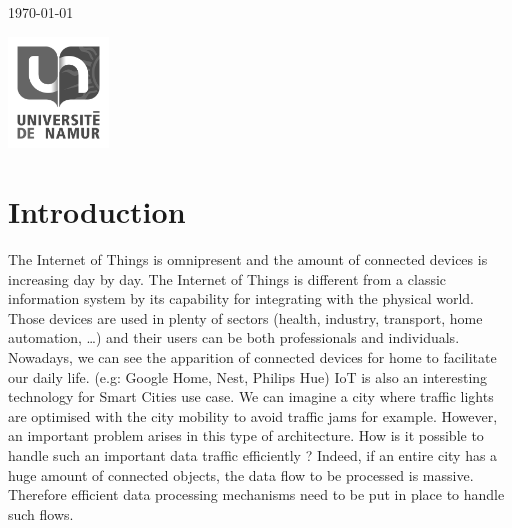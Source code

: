 \documentclass[11pt]{article}
\begin{document}
\begin{titlepage}
	
	\vfill\vfill\vfill %
	
	{\large\today} %
	
	
	\vfill\vfill
	\includegraphics[width=0.2\textwidth]{placeholder.png}\\[1cm] %
	 
	
	\vfill %
	
\end{titlepage}



\section{Introduction}

The Internet of Things is omnipresent and the amount of connected devices is increasing day by day.
The Internet of Things is different from a classic information system by its capability for integrating with the physical world.
Those devices are used in plenty of sectors (health, industry, transport, home automation, \ldots) and their users can be both professionals and individuals.
Nowadays, we can see the apparition of connected devices for home to facilitate our daily life. (e.g: Google Home, Nest, Philips Hue)
IoT is also an interesting technology for Smart Cities use case.
We can imagine a city where traffic lights are optimised with the city mobility to avoid traffic jams for example.
However, an important problem arises in this type of architecture.
How is it possible to handle such an important data traffic efficiently ?
Indeed, if an entire city has a huge amount of connected objects, the data flow to be processed is massive.
Therefore efficient data processing mechanisms need to be put in place to handle such flows.
\end{document}
